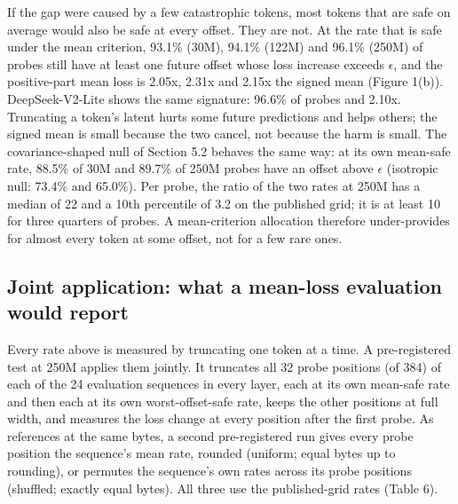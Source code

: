\documentclass[11pt]{article}
\begin{document}
If the gap were caused by a few catastrophic tokens, most tokens that are safe on average would also be safe at every offset. They are not. At the rate that is safe under the mean criterion, 93.1\% (30M), 94.1\% (122M) and 96.1\% (250M) of probes still have at least one future offset whose loss increase exceeds $\epsilon$, and the positive-part mean loss is 2.05x, 2.31x and 2.15x the signed mean (Figure 1(b)). DeepSeek-V2-Lite shows the same signature: 96.6\% of probes and 2.10x. Truncating a token's latent hurts some future predictions and helps others; the signed mean is small because the two cancel, not because the harm is small. The covariance-shaped null of Section 5.2 behaves the same way: at its own mean-safe rate, 88.5\% of 30M and 89.7\% of 250M probes have an offset above $\epsilon$ (isotropic null: 73.4\% and 65.0\%). Per probe, the ratio of the two rates at 250M has a median of 22 and a 10th percentile of 3.2 on the published grid; it is at least 10 for three quarters of probes. A mean-criterion allocation therefore under-provides for almost every token at some offset, not for a few rare ones.

\subsection{Joint application: what a mean-loss evaluation would report}

Every rate above is measured by truncating one token at a time. A pre-registered test at 250M applies them jointly. It truncates all 32 probe positions (of 384) of each of the 24 evaluation sequences in every layer, each at its own mean-safe rate and then each at its own worst-offset-safe rate, keeps the other positions at full width, and measures the loss change at every position after the first probe. As references at the same bytes, a second pre-registered run gives every probe position the sequence's mean rate, rounded (uniform; equal bytes up to rounding), or permutes the sequence's own rates across its probe positions (shuffled; exactly equal bytes). All three use the published-grid rates (Table 6).
\end{document}
